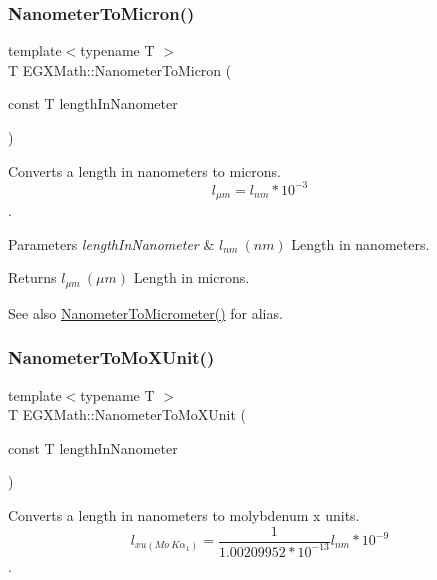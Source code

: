 \subsubsection{\texorpdfstring{Nanometer\+To\+Micron()}{NanometerToMicron()}}
{\footnotesize\ttfamily template$<$typename T $>$ \\
T E\+G\+X\+Math\+::\+Nanometer\+To\+Micron (\begin{DoxyParamCaption}\item[{const T}]{length\+In\+Nanometer }\end{DoxyParamCaption})}



Converts a length in nanometers to microns. \[ l_{\mu m}=l_{nm} * 10^{-3} \]. 


\begin{DoxyParams}{Parameters}
{\em length\+In\+Nanometer} & $ l_{nm}\ (nm)$ Length in nanometers. \\
\hline
\end{DoxyParams}
\begin{DoxyReturn}{Returns}
$ l_{\mu m}\ (\mu m)$ Length in microns. 
\end{DoxyReturn}
\begin{DoxySeeAlso}{See also}
\mbox{\hyperlink{group___e_g_x_math-_conversions-_length_conversions-_nanometer-_s_i_gaa539df5d709bface86429c8a25d7f6e1}{Nanometer\+To\+Micrometer()}} for alias. 
\end{DoxySeeAlso}
\mbox{\label{group___e_g_x_math-_conversions-_length_conversions-_nanometer-_non-_s_i_gacc6d7fa95c35687718c816df3c95c7b5}} 
\subsubsection{\texorpdfstring{Nanometer\+To\+Mo\+X\+Unit()}{NanometerToMoXUnit()}}
{\footnotesize\ttfamily template$<$typename T $>$ \\
T E\+G\+X\+Math\+::\+Nanometer\+To\+Mo\+X\+Unit (\begin{DoxyParamCaption}\item[{const T}]{length\+In\+Nanometer }\end{DoxyParamCaption})}



Converts a length in nanometers to molybdenum x units. \[ l_{xu(Mo\ K\alpha_1)}=\frac{1}{1.00209952*10^{-13}} l_{nm} * 10^{-9}\]. 


